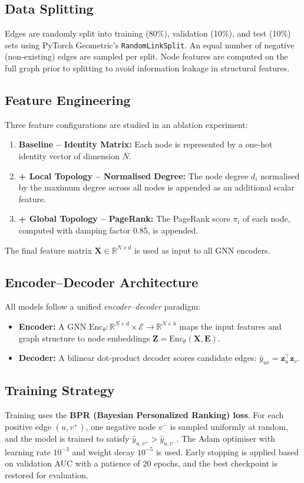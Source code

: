 \documentclass[conference]{IEEEtran}
\begin{document}
\subsection{Data Splitting}
Edges are randomly split into training (80\%), validation (10\%), and test (10\%) sets using PyTorch Geometric's \texttt{RandomLinkSplit}. An equal number of negative (non‑existing) edges are sampled per split. Node features are computed on the full graph prior to splitting to avoid information leakage in structural features.

\subsection{Feature Engineering}\label{sec:features}
Three feature configurations are studied in an ablation experiment:
\begin{enumerate}
  \item \textbf{Baseline – Identity Matrix:} Each node is represented by a one‑hot identity vector of dimension $N$.
  \item \textbf{+ Local Topology – Normalised Degree:} The node degree $d_i$ normalised by the maximum degree across all nodes is appended as an additional scalar feature.
  \item \textbf{+ Global Topology – PageRank:} The PageRank score $\pi_i$ of each node, computed with damping factor 0.85, is appended.
\end{enumerate}
The final feature matrix $\mathbf{X}\in\mathbb{R}^{N\times d}$ is used as input to all GNN encoders.

\subsection{Encoder–Decoder Architecture}
All models follow a unified \textit{encoder–decoder} paradigm:
\begin{itemize}
  \item \textbf{Encoder:} A GNN $\text{Enc}_\theta:\mathbb{R}^{N\times d}\times\mathcal{E}\to\mathbb{R}^{N\times h}$ maps the input features and graph structure to node embeddings $\mathbf{Z}=\text{Enc}_\theta(\mathbf{X},\mathbf{E})$.
  \item \textbf{Decoder:} A bilinear dot‑product decoder scores candidate edges: $\hat{y}_{uv}=\mathbf{z}_u^{\top}\mathbf{z}_v$.
\end{itemize}

\subsection{Training Strategy}
Training uses the \textbf{BPR (Bayesian Personalized Ranking) loss}. For each positive edge $(u,v^+)$, one negative node $v^-$ is sampled uniformly at random, and the model is trained to satisfy $\hat{y}_{u,v^+}>\hat{y}_{u,v^-}$. The Adam optimiser with learning rate $10^{-3}$ and weight decay $10^{-5}$ is used. Early stopping is applied based on validation AUC with a patience of 20 epochs, and the best checkpoint is restored for evaluation.
\end{document}
